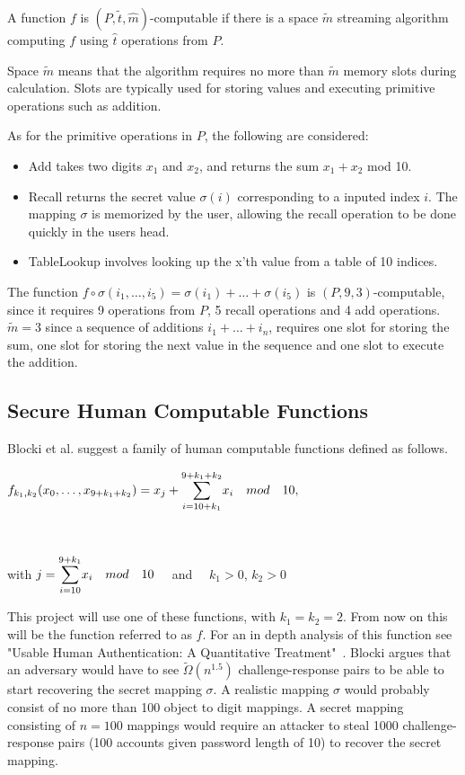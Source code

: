 \begin{definition}
    \label{ptm-computable}
    A function $f$ is $(P, \tilde t, \hat m)$-computable if there is a space $\tilde m$ streaming algorithm computing $f$ using $\hat t$ operations from $P$.
\end{definition}
\begin{remark}
Space $\tilde m$ means that the algorithm requires no more than $\tilde m$ memory slots during calculation. Slots are typically used for storing values and executing primitive operations such as addition.
\end{remark}



\noindent As for the primitive operations in $P$, the following are considered:
\begin{itemize}
    \item{Add} takes two digits $x_1$ and $x_2$, and returns the sum $x_1 + x_2$ mod 10.
    \item{Recall} returns the secret value $\sigma(i)$ corresponding to a inputed index $i$. The mapping $\sigma$ is memorized by the user, allowing the recall operation to be done quickly in the users head.
    \item{TableLookup} involves looking up the x'th value from a table of 10 indices.
\end{itemize}

\begin{example}
    The function $f \circ \sigma(i_1,\dots,i_5) = \sigma(i_1) + \dots + \sigma(i_5)$ is $(P,9,3)$-computable, since it requires 9 operations from $P$, 5 recall operations and 4 add operations. $\tilde m=3$ since a sequence of additions $i_1 + \dots + i_n$, requires one slot for storing the sum, one slot for storing the next value in the sequence and one slot to execute the addition.
\end{example}


\subsection{Secure Human Computable Functions}
Blocki et al. \cite{hcp-blocki} suggest a family of human computable functions defined as follows.
\centerline{ $ f_{k_1,k_2}(x_0,\dots,x_{9+k_1+k_2})= x_j + \mathlarger{\sum}\limits^{9+k_1+k_2}_{i=10+k_1} x_i \quad mod\quad 10,$}\\
\centerline{with $j = \mathlarger{\sum}\limits^{9+k_1}_{i=10} x_i \quad mod \quad 10\quad$ and $\quad k_1>0$, $k_2>0$ }
\vspace{2mm}
\par This project will use one of these functions, with $k_1=k_2=2$. From now on this will be the function referred to as $f$. For an in depth analysis of this function see "Usable Human Authentication: A Quantitative Treatment"~\cite{Blocki2014}. Blocki argues that an adversary would have to see $\tilde \Omega(n^{1.5})$ challenge-response pairs to be able to start recovering the secret mapping $\sigma$. A realistic mapping $\sigma$ would probably consist of no more than 100 object to digit mappings. A secret mapping consisting of $n=100$ mappings would require an attacker to steal 1000 challenge-response pairs (100 accounts given password length of 10) to recover the secret mapping. 

